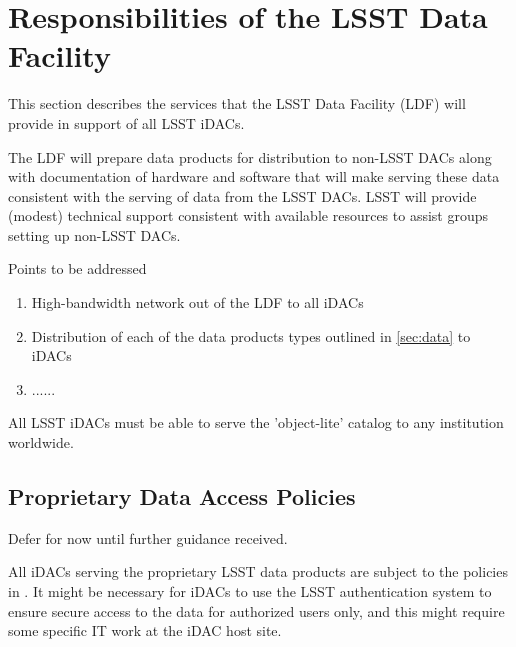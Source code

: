 \section{Responsibilities of the LSST Data Facility}

This section describes the services that the LSST Data Facility (LDF) will provide in support of all LSST iDACs.

The LDF will prepare data products for distribution to non-LSST DACs along with documentation of hardware and software that will make serving these data consistent with the serving of data from the LSST DACs. LSST will provide (modest) technical support consistent with available resources to assist groups setting up non-LSST DACs.


Points to be addressed
\begin{enumerate}
\item High-bandwidth network out of the LDF to all iDACs
\item Distribution of each of the data products types outlined in \ref{sec:data} to iDACs
\item ......
\end{enumerate}


All LSST  iDACs must be able to serve the 'object-lite' catalog to any institution worldwide.


\subsection{Proprietary Data Access Policies}
{\color{red}Defer for now until further guidance received.} \newline

All iDACs serving the proprietary LSST data products are subject to the policies in . It might be necessary for iDACs to use the LSST authentication system to ensure secure access to the data for authorized users only, and this might require some specific IT work at the iDAC host site.


